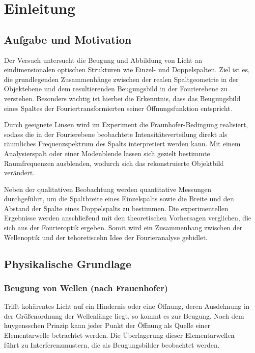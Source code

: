 \chapter{Einleitung} \label{ch:Einleitung}

\section{Aufgabe und Motivation} \label{sec:AuM}

Der Versuch untersucht die Beugung und Abbildung von Licht an eindimensionalen optischen Strukturen wie Einzel- und Doppelspalten. Ziel ist es, die grundlegenden Zusammenhänge zwischen der realen Spaltgeometrie in der Objektebene und dem resultierenden Beugungsbild in der Fourierebene zu verstehen. Besonders wichtig ist hierbei die Erkenntnis, dass das Beugungsbild eines Spaltes der Fouriertransformierten seiner Öffnungsfunktion entspricht. 

Durch geeignete Linsen wird im Experiment die Fraunhofer-Bedingung realisiert, sodass die in der Fourierebene beobachtete Intensitätsverteilung direkt als räumliches Frequenzspektrum des Spalts interpretiert werden kann. Mit einem Analysierspalt oder einer Modenblende lassen sich gezielt bestimmte Raumfrequenzen ausblenden, wodurch sich das rekonstruierte Objektbild verändert. 


Neben der qualitativen Beobachtung werden quantitative Messungen durchgeführt, um die Spaltbreite eines Einzelspalts sowie die Breite und den Abstand der Spalte eines Doppelspalts zu bestimmen. Die experimentellen Ergebnisse werden anschließend mit den theoretischen Vorhersagen verglichen, die sich aus der Fourieroptik ergeben. Somit wird ein Zusammenhang zwischen der Wellenoptik und der tehoretiscehn Idee der Fourieranalyse gebidlet.


\section{Physikalische Grundlage} \label{sec:PhyBasics}


\subsection[Beugung]{Beugung von Wellen (nach Frauenhofer)}

Trifft kohärentes Licht auf ein Hindernis oder eine Öffnung, deren Ausdehnung in der Größenordnung der Wellenlänge liegt, so kommt es zur Beugung. Nach dem huygensschen Prinzip kann jeder Punkt der Öffnung als Quelle einer Elementarwelle betrachtet werden. Die Überlagerung dieser Elementarwellen führt zu Interferenzmustern, die als Beugungsbilder beobachtet werden. 

